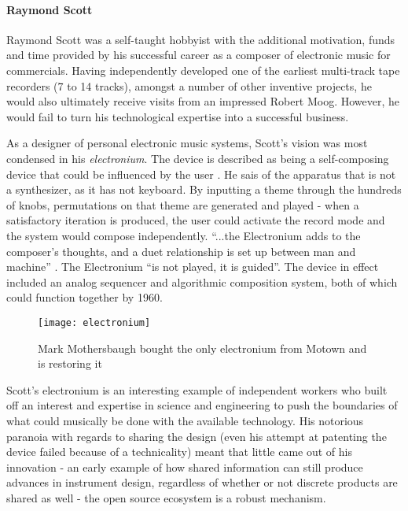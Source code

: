 \begin{itemize}
\paragraph{Raymond Scott}

Raymond Scott was a self-taught hobbyist with the additional motivation, funds and time provided by his successful career as a composer of electronic music for commercials. Having independently developed one of the earliest multi-track tape recorders (7 to 14 tracks), amongst a number of other inventive projects, he would also ultimately receive visits from an impressed Robert Moog. However, he would fail to turn his technological expertise into a successful business. 

As a designer of personal electronic music systems, Scott's vision was most condensed in his \emph{electronium}. The device is described as being a self-composing device that could be influenced by the user \cite[p.142]{holmes2002}. He sais of the apparatus that is not a synthesizer, as it has not keyboard. By inputting a theme through the hundreds of knobs, permutations on that theme are generated and played - when a satisfactory iteration is produced, the user could activate the record mode and the system would compose independently. ``...the Electronium adds to the composer's thoughts, and a duet relationship is set up between man and machine'' \cite{chusid1999}. The Electronium ``is not played, it is guided''\cite{darter1984}. The device in effect included an analog sequencer and algorithmic composition system, both of which could function together by 1960. 

	\begin{figure}[h!]
	  \caption{Mark Mothersbaugh bought the only electronium from Motown and is restoring it}
	  \centering
	    \texttt{[image: electronium]}
	\end{figure}
	
Scott's electronium is an interesting example of independent workers who built off an interest and expertise in science and engineering to push the boundaries of what could musically be done with the available technology. His notorious paranoia with regards to sharing the design (even his attempt at patenting the device failed because of a technicality) meant that little came out of his innovation - an early example of how shared information can still produce advances in instrument design, regardless of whether or not discrete products are shared as well - the open source ecosystem is a robust mechanism. 


\end{itemize}

